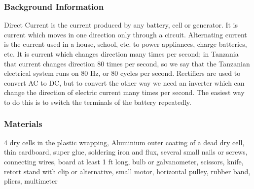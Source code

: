 \subsubsection*{Background Information}
Direct Current is the current produced by any battery, cell or generator. It is current which moves in one direction only through a circuit. Alternating current is the current used in a house, school, etc. to power appliances, charge batteries, etc. It is current which changes direction many times per second; in Tanzania that current changes direction 80 times per second, so we say that the Tanzanian electrical system runs on 80 Hz, or 80 cycles per second.  
Rectifiers are used to convert AC to DC, but to convert the other way we need an inverter which can change the direction of electric current many times per second. The easiest way to do this is to switch the terminals of the battery repeatedly.  

\subsubsection*{Materials}
4 dry cells in the plastic wrapping, Aluminium outer coating of a dead dry cell, thin cardboard, super glue, soldering iron and flux, several small nails or screws, connecting wires, board at least 1 ft long, bulb or galvanometer, scissors, knife, retort stand with clip or alternative, small motor, horizontal pulley, rubber band, pliers, multimeter


